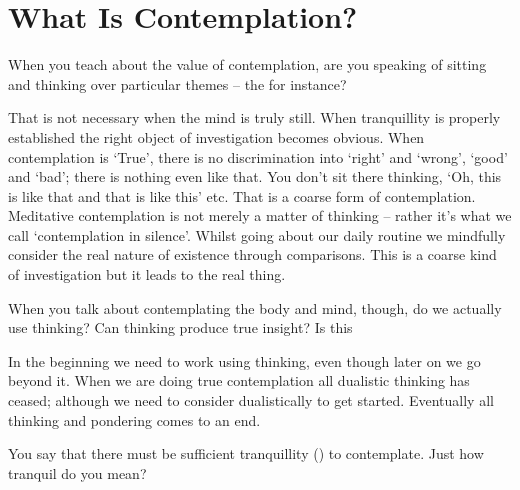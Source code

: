 %
%
%

\renewcommand{\chapterFootnotemark}{\footnotemark}
\renewcommand{\chapterFootnotetext}{\footnotetext{\textit{Note:} The following teaching is taken from a session of questions and answers that took place at Wat Gor Nork monastery during the Vassa of 1979, between Venerable Ajahn Chah and a group of English-speaking disciples. Some rearrangement of the sequence of conversation has been made for ease of understanding.}}

\chapter{What Is Contemplation?}

When you teach about the value of contemplation, are you speaking of sitting and thinking over particular themes -- the  for instance?

\noindent{}
That is not necessary when the mind is truly still. When tranquillity is properly established the right object of investigation becomes obvious. When contemplation is `True', there is no discrimination into `right' and `wrong', `good' and `bad'; there is nothing even like that. You don't sit there thinking, `Oh, this is like that and that is like this' etc. That is a coarse form of contemplation. Meditative contemplation is not merely a matter of thinking -- rather it's what we call `contemplation in silence'. Whilst going about our daily routine we mindfully consider the real nature of existence through comparisons. This is a coarse kind of investigation but it leads to the real thing.

When you talk about contemplating the body and mind, though, do we actually use thinking? Can thinking produce true insight? Is this 

In the beginning we need to work using thinking, even though later on we go beyond it. When we are doing true contemplation all dualistic thinking has ceased; although we need to consider dualistically to get started. Eventually all thinking and pondering comes to an end.

You say that there must be sufficient tranquillity () to con\-tem\-plate. Just how tranquil do you mean?

